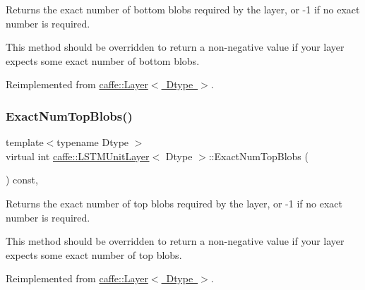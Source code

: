 Returns the exact number of bottom blobs required by the layer, or -\/1 if no exact number is required. 

This method should be overridden to return a non-\/negative value if your layer expects some exact number of bottom blobs. 

Reimplemented from \mbox{\hyperlink{classcaffe_1_1_layer_a8e5ee0494d85f5f55fc4396537cbc60f}{caffe\+::\+Layer$<$ Dtype $>$}}.

\mbox{\label{classcaffe_1_1_l_s_t_m_unit_layer_a5f56fd304b6581697cbf309ebb8bc9b7}} 
\subsubsection{\texorpdfstring{Exact\+Num\+Top\+Blobs()}{ExactNumTopBlobs()}\hspace{0.1cm}{\footnotesize\ttfamily [1/2]}}
{\footnotesize\ttfamily template$<$typename Dtype $>$ \\
virtual int \mbox{\hyperlink{classcaffe_1_1_l_s_t_m_unit_layer}{caffe\+::\+L\+S\+T\+M\+Unit\+Layer}}$<$ Dtype $>$\+::Exact\+Num\+Top\+Blobs (\begin{DoxyParamCaption}{ }\end{DoxyParamCaption}) const\hspace{0.3cm}{\ttfamily [inline]}, {\ttfamily [virtual]}}



Returns the exact number of top blobs required by the layer, or -\/1 if no exact number is required. 

This method should be overridden to return a non-\/negative value if your layer expects some exact number of top blobs. 

Reimplemented from \mbox{\hyperlink{classcaffe_1_1_layer_a64e2ca72c719e4b2f1f9216ccfb0d37f}{caffe\+::\+Layer$<$ Dtype $>$}}.

\mbox{\label{classcaffe_1_1_l_s_t_m_unit_layer_a5f56fd304b6581697cbf309ebb8bc9b7}} 
